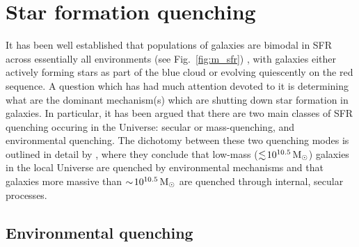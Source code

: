 \section{Star formation quenching}
\label{sec:sfr_quench}

It has been well established that populations of galaxies are bimodal
in SFR across essentially all environments (see Fig.~\ref{fig:m_sfr})
\citep[e.g.][]{wetzel2012}, with galaxies either actively forming
stars as
part of the blue cloud or evolving quiescently on the red sequence.  A
question which has had much attention devoted to it is determining
what are the dominant mechanism(s) which are shutting down star
formation in galaxies.  In particular, it has been argued that there
are two main classes of SFR quenching occuring in the Universe: secular
or mass-quenching, and environmental quenching.  The dichotomy between
these two quenching modes is outlined in detail by \citet{peng2010},
where they conclude that low-mass ($\lesssim \! 10^{10.5}\,\mathrm{M_{\odot}}$)
galaxies in the local Universe are quenched by environmental
mechanisms and that galaxies more massive than $\sim \!
10^{10.5}\,\mathrm{M_{\odot}}$ are quenched through internal, secular processes.  

\subsection{Environmental quenching}
\label{sec:enviro_quench}

